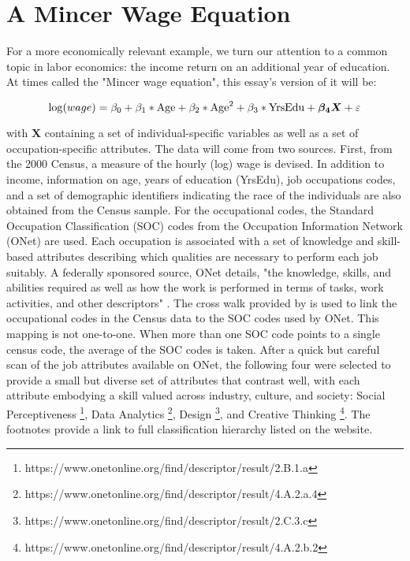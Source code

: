\documentclass[12pt]{article}
\theoremstyle{definition}
\begin{document}
\clearpage


\section{A Mincer Wage Equation} \label{sec:MincerWageEx}

For a more economically relevant example, we turn our attention to a common
topic in labor economics: the income return on an additional year of
education. At times called the "Mincer wage equation", this essay's version of it
will be:

\begin{equation} \label{eq:mincer_equ}
  \log (wage) = \beta_{0} + \beta_{1} * \textnormal{Age} + \beta_{2} * \textnormal{Age}^{2} + \beta_{3} * \textnormal{YrsEdu} + \boldsymbol{\beta_{4}}\boldsymbol{X} + \varepsilon
\end{equation}

with $\boldsymbol{X}$ containing a set of individual-specific 
variables as well as a set of occupation-specific attributes. 
The data will come from two sources. First, from the 2000 Census,
a measure of the hourly (log) wage is devised. In addition to income,
information on age, years of education (YrsEdu), job occupations codes, 
and a set of demographic identifiers indicating the race of the
individuals are also obtained from the Census sample. For the occupational codes,
the Standard Occupation Classification (SOC) codes from the
Occupation Information Network (ONet) are used. Each occupation is
associated with a set of knowledge and skill-based
attributes describing which qualities are necessary to perform each
job suitably. A federally sponsored source, ONet details, "the knowledge,
skills, and abilities required as well as how the work is
performed in terms of tasks, work activities, and other descriptors"
\citep{ONET}. The cross walk provided by \citet{Crosswalk} is used to
link the occupational codes in the Census data to the SOC codes used
by ONet. This mapping is not one-to-one. When more than one SOC code
points to a single census code, the average of the SOC codes is taken.
After a quick but careful scan of the job attributes
available on ONet, the following four were selected to provide
a small but diverse set of attributes that contrast well, with each attribute
embodying a skill valued across industry, culture, and society:
Social Perceptiveness \footnote{https://www.onetonline.org/find/descriptor/result/2.B.1.a},
Data Analytics \footnote{https://www.onetonline.org/find/descriptor/result/4.A.2.a.4},
Design \footnote{https://www.onetonline.org/find/descriptor/result/2.C.3.c},
and Creative Thinking \footnote{https://www.onetonline.org/find/descriptor/result/4.A.2.b.2}.
The footnotes provide a link to  full classification hierarchy listed on the website. 
\end{document}
